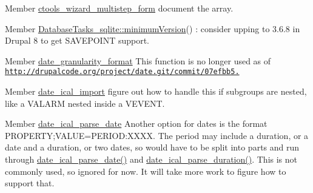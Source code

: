 \begin{DoxyDescription}
\item[Member \hyperlink{wizard_8inc_a0b42108018cbf45ee377a2fbbe980716}{ctools\_\-wizard\_\-multistep\_\-form} ]document the array. 
\end{DoxyDescription}

\label{todo__todo000003}
\hypertarget{todo__todo000003}{}
 
\begin{DoxyDescription}
\item[Member \hyperlink{classDatabaseTasks__sqlite_ac546ff3ed7f1ece5726b3c5cd7a39ef9}{DatabaseTasks\_\-sqlite::minimumVersion}() ]: consider upping to 3.6.8 in Drupal 8 to get SAVEPOINT support. 
\end{DoxyDescription}

\label{todo__todo000047}
\hypertarget{todo__todo000047}{}
 
\begin{DoxyDescription}
\item[Member \hyperlink{date__api_8module_ab17bb31df64a3d11cf8bddb49f5e20fd}{date\_\-granularity\_\-format} ]This function is no longer used as of \href{http://drupalcode.org/project/date.git/commit/07efbb5.}{\tt http://drupalcode.org/project/date.git/commit/07efbb5.} 
\end{DoxyDescription}

\label{todo__todo000049}
\hypertarget{todo__todo000049}{}
 
\begin{DoxyDescription}
\item[Member \hyperlink{date__api__ical_8inc_a9c32ef84b7717c5f5b9333a14aab9e17}{date\_\-ical\_\-import} ]figure out how to handle this if subgroups are nested, like a VALARM nested inside a VEVENT.


\end{DoxyDescription}

\label{todo__todo000050}
\hypertarget{todo__todo000050}{}
 
\begin{DoxyDescription}
\item[Member \hyperlink{date__api__ical_8inc_a043a6a7b1c9724a27cd16750f01492c4}{date\_\-ical\_\-parse\_\-date} ]Another option for dates is the format PROPERTY;VALUE=PERIOD:XXXX. The period may include a duration, or a date and a duration, or two dates, so would have to be split into parts and run through \hyperlink{date__api__ical_8inc_a043a6a7b1c9724a27cd16750f01492c4}{date\_\-ical\_\-parse\_\-date()} and \hyperlink{date__api__ical_8inc_a8a63c8aa2158e701b01217637169440d}{date\_\-ical\_\-parse\_\-duration()}. This is not commonly used, so ignored for now. It will take more work to figure how to support that. 
\end{DoxyDescription}

